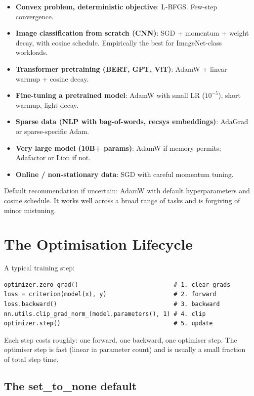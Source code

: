 \begin{itemize}
  \item \textbf{Convex problem, deterministic objective}:
    L-BFGS. Few-step convergence.
  \item \textbf{Image classification from scratch (CNN)}:
    SGD + momentum + weight decay, with cosine schedule.
    Empirically the best for ImageNet-class workloads.
  \item \textbf{Transformer pretraining (BERT, GPT, ViT)}:
    AdamW + linear warmup + cosine decay.
  \item \textbf{Fine-tuning a pretrained model}: AdamW with
    small LR ($10^{-5}$), short warmup, light decay.
  \item \textbf{Sparse data (NLP with bag-of-words, recsys
    embeddings)}: AdaGrad or sparse-specific Adam.
  \item \textbf{Very large model (10B+ params)}: AdamW if
    memory permits; Adafactor or Lion if not.
  \item \textbf{Online / non-stationary data}: SGD with
    careful momentum tuning.
\end{itemize}

Default recommendation if uncertain: AdamW with default
hyperparameters and cosine schedule. It works well across a
broad range of tasks and is forgiving of minor mistuning.

\section{The Optimisation Lifecycle}
\label{sec:optimizers:lifecycle}

A typical training step:

\begin{lstlisting}[style=lucid,language=LucidPython]
optimizer.zero_grad()                           # 1. clear grads
loss = criterion(model(x), y)                   # 2. forward
loss.backward()                                 # 3. backward
nn.utils.clip_grad_norm_(model.parameters(), 1) # 4. clip
optimizer.step()                                # 5. update
\end{lstlisting}

Each step costs roughly: one forward, one backward, one
optimiser step. The optimiser step is fast (linear in parameter
count) and is usually a small fraction of total step time.

\subsection{The set\_to\_none default}
\label{ssec:optimizers:set_to_none}

